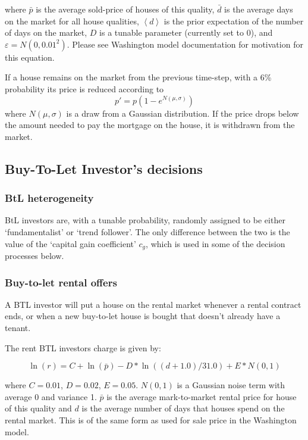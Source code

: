 \documentclass{report}
\begin{document}
\bigskip

where $\bar{p}$ is the average sold-price of houses of this quality, $\bar{d}
$ is the average days on the market for all house qualities, $\left\langle
d\right\rangle $ is the prior expectation of the number of days on the
market, $D$ is a tunable parameter (currently set to 0), and $\varepsilon
=N(0,0.01^{2})$. Please see Washington model documentation for motivation for this equation.

If a house remains on the market from the previous time-step, with a 6\%
probability its price is reduced according to
\begin{equation}
p' = p\left(1-e^{N(\mu,\sigma)}\right)
\label{reprice}
\end{equation}
where $N(\mu,\sigma)$ is a draw from a Gaussian distribution.
 If the price drops below the amount needed to pay the mortgage on the house, it is withdrawn from the market.

\subsection{Buy-To-Let Investor's decisions}
\subsubsection{BtL heterogeneity}
BtL investors are, with a tunable probability, randomly assigned to be either `fundamentalist' or `trend follower'. The only difference between the two is the value of the `capital gain coefficient' $c_{g}$, which is used in some of the decision processes below.

\subsubsection{Buy-to-let rental offers}
A BTL investor will put a house on the rental market
whenever a rental contract ends, or when a new buy-to-let house is bought
that doesn't already have a tenant. 

The rent BTL investors charge is given by:

\begin{equation}
\ln(r)=C+\ln (\bar{p})-D\ast \ln((d+1.0)/31.0)+E\ast N(0,1)
\end{equation}

\bigskip

where $C=0.01$, $D=0.02$, $E=0.05$. $N(0,1)$ is a Gaussian noise term with
average 0 and variance 1. $\bar{p}$ is the average mark-to-market rental
price for house of this quality and $d$ is the average number of days that houses spend on the rental market. This is of the same form as used for sale price in the Washington model.
\end{document}
